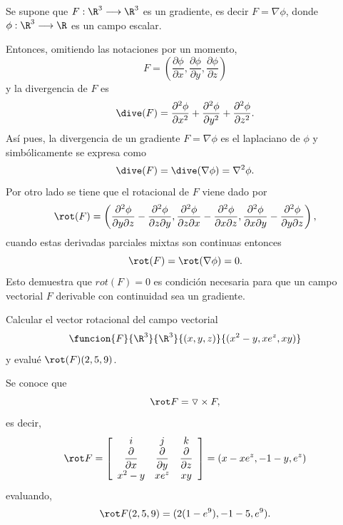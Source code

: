 \documentclass[a4,11pt]{aleph-examen}
\begin{document}
\begin{preguntas}
\begin{respuesta}
\begin{respuesta}
\begin{respuesta}
    Se supone que $F:\R^3 \longrightarrow \R^3$ es un gradiente, es decir $F=\nabla \phi $, donde $\phi:\R^3 \longrightarrow \R$ es un campo escalar.  
    
    Entonces, omitiendo las notaciones por un momento,
    \[
    F=\left( \frac{\partial \phi}{\partial x},\frac{\partial \phi}{\partial y},\frac{\partial \phi}{\partial z} \right)
    \]
    y la divergencia de $F$ es
    \[
    \dive(F)=\frac{\partial^2 \phi}{\partial x^2}+\frac{\partial^2 \phi}{\partial y^2}+\frac{\partial^2 \phi}{\partial z^2} .
    \]
    Así pues, la divergencia de un gradiente $F=\nabla \phi$ es el laplaciano de $\phi$ y simbólicamente se expresa como
    \[
    \dive(F)=\dive(\nabla \phi)=\nabla ^2 \phi.
    \]
    Por otro lado se tiene que el rotacional de $F$ viene dado por
    \[
    \rot(F)=\left( \frac{\partial^2 \phi}{\partial y \partial z}-\frac{\partial^2 \phi}{\partial z \partial y},\frac{\partial^2 \phi}{\partial z \partial x}-\frac{\partial^2 \phi}{\partial x \partial z},\frac{\partial^2 \phi}{\partial x \partial y}-\frac{\partial^2 \phi}{\partial y \partial z} \right), 
    \]
    cuando estas derivadas parciales mixtas son continuas entonces 
    \[
    \rot(F)=\rot(\nabla \phi)=0.
    \]
    Esto demuestra que $rot(F)=0$ es condición necesaria para que un campo vectorial $F$  derivable con continuidad sea un gradiente.
\end{respuesta}



\item
	Calcular el vector rotacional del campo vectorial
    \[
        \funcion{F}{\R^3}{\R^3}{(x,y,z)}{(x^2-y,xe^z,xy)}
    \]
    y evalué $\rot(F)(2,5,9)$.

\begin{respuesta}
    Se conoce que
    \[
    \rot F= \triangledown \times F,
    \]
    es decir,
    \[
        \rot F=
        \left[
        \begin{array}{ccc}
		i & j & k \\
		\dfrac{\partial}{\partial x} & \dfrac{\partial}{\partial y} & \dfrac{\partial}{\partial z}\\
        x^2-y & xe^z & xy
        \end{array} 
        \right]
        =(x-xe^z,-1-y,e^z)
    \]
    evaluando,
    \[
    \rot F(2,5,9)=(2(1-e^9), -1-5, e^9).
    \]
\end{respuesta}


\end{respuesta}
\end{respuesta}
\end{preguntas}
\end{document}

